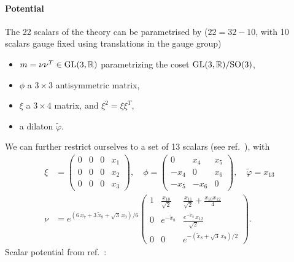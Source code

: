 \documentclass[11pt]{article}
\begin{document}
\paragraph{Potential}
The 22 scalars of the theory can be parametrised by ($22 = 32 - 10$, with 10 scalars gauge fixed using translations in the gauge group)
\begin{itemize}[label=\textbullet]
	\item $m = \nu\nu^{T}\in{\rm GL}(3,\mathbb{R})$ parametrizing the coset ${\rm GL}(3,\mathbb{R})/{\rm SO}(3)$,
	\item $\phi$ a $3\times3$ antisymmetric matrix,
	\item $\xi$ a $3\times4$ matrix, and $\xi^{2} = \xi \xi^{T}$,
	\item a dilaton $\tilde{\varphi}$.
\end{itemize}
We can further restrict ourselves to a set of 13 scalars (see ref.~\cite{Eloy:2021fhc}), with
\begin{equation}
	\begin{aligned}
		\xi &= \begin{pmatrix}
					0 & 0 & 0 & x_{1} \\
					0 & 0 & 0 & x_{2} \\
					0 & 0 & 0 & x_{3}
				\end{pmatrix},
		\quad
		\phi = \begin{pmatrix}
					0 & x_{4} & x_{5} \\
					-x_{4} & 0 & x_{6} \\
					-x_{5} & -x_{6} & 0
				\end{pmatrix},
		\quad
		\tilde{\varphi} = x_{13} \\[5pt]
		\nu &= e^{(6\,x_{7}+3\,\tilde{x}_{8}+\sqrt{3}\,x_{9})/6}
				\begin{pmatrix}
					1 & \frac{x_{10}}{\sqrt{2}} & \frac{x_{11}}{\sqrt{2}} + \frac{x_{10}x_{12}}{4} \\
					0 & e^{-\tilde{x}_{8}} & \frac{e^{-\tilde{x}_{8}}\,x_{12}}{\sqrt{2}} \\
					0 & 0 & e^{-(\tilde{x}_{8}+\sqrt{3}\,x_{9})/2}
				\end{pmatrix}.
	\end{aligned}
\end{equation}
Scalar potential from ref.~\cite{Eloy:2021fhc}:
%
\end{document}
